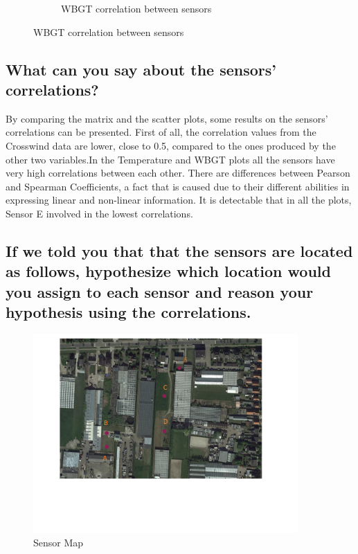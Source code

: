 \documentclass[a4paper,12pt]{article} %
\begin{document}
\begin{figure}[H]
\begin{subfigure}[b]{0.4\linewidth}
		\caption{WBGT correlation between sensors}
	\end{subfigure}
\end{figure}

\subsection{What can you say about the sensors’ correlations?}

By comparing the matrix and the scatter plots, some results on the sensors' correlations can be presented. First of all, the correlation values from the Crosswind data are lower, close to 0.5, compared to the ones produced by the other two variables.In the Temperature and WBGT plots all the sensors have very high correlations between each other. There are differences between Pearson and Spearman Coefficients, a fact that is caused due to their different abilities in expressing linear and non-linear information. It is detectable that in all the plots, Sensor E involved in the lowest correlations.

\subsection{If we told you that that the sensors are located as follows, hypothesize which location would you assign to each sensor and reason your hypothesis using the correlations.}

\begin{figure}[H] %
	\centering %
	\includegraphics[width=0.9\textwidth]{SensorsSketch.png} 
	\caption{Sensor Map} %
\end{figure}
\end{document}
